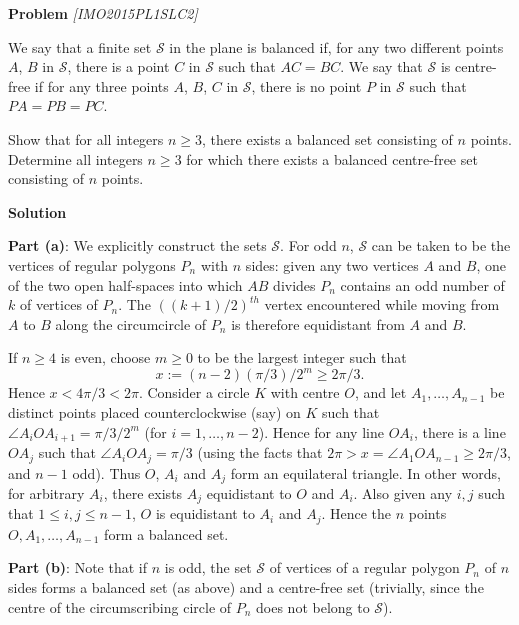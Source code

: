 \begin{problem}



\textbf{Problem}
\textit{[IMO2015PL1SLC2]}


We say that a finite set $\mathcal{S}$ in the plane is balanced if, for any two different points $A$, $B$ in $\mathcal{S}$, there is a point $C$ in $\mathcal{S}$ such that $AC=BC$. We say that $\mathcal{S}$ is centre-free if for any three points $A$, $B$, $C$ in $\mathcal{S}$, there is no point $P$ in $\mathcal{S}$ such that $PA=PB=PC$.

Show that for all integers $n\geq 3$, there exists a balanced set consisting of $n$ points.
Determine all integers $n\geq 3$ for which there exists a balanced centre-free set consisting of $n$ points.

\textbf{Solution}

\textbf{Part (a)}: We explicitly construct the sets $\mathcal{S}$. For odd $n$, $\mathcal{S}$ can be taken to be the vertices of regular polygons $P_n$ with $n$ sides: given any two vertices $A$ and $B$, one of the two open half-spaces into which $AB$ divides $P_n$ contains an odd number of $k$ of vertices of $P_n$. The $((k+1)/2)^{th}$ vertex encountered while moving from $A$ to $B$ along the circumcircle of $P_n$ is therefore equidistant from $A$ and $B$.

If $n \geq 4$ is even, choose $m\geq 0$ to be the largest integer such that\[x:=(n-2)(\pi/3)/2^m \geq 2\pi/3.\]Hence $x < 4\pi/3 < 2\pi$. Consider a circle $K$ with centre $O$, and let $A_1, \ldots, A_{n-1}$ be distinct points placed counterclockwise (say) on $K$ such that $\angle A_iOA_{i+1}=\pi/3/2^m$ (for $i=1,\ldots,n-2$). Hence for any line $OA_i$, there is a line $OA_j$ such that $\angle A_iOA_j=\pi/3$ (using the facts that $2\pi > x=\angle A_1OA_{n-1} \geq 2\pi/3$, and $n-1$ odd). Thus $O$, $A_i$ and $A_j$ form an equilateral triangle. In other words, for arbitrary $A_i$, there exists $A_j$ equidistant to $O$ and $A_i$. Also given any $i,j$ such that $1 \leq i, j \leq n-1$, $O$ is equidistant to $A_i$ and $A_j$. Hence the $n$ points $O, A_1, \ldots, A_{n-1}$ form a balanced set.

\textbf{Part (b)}: Note that if $n$ is odd, the set $\mathcal{S}$ of vertices of a regular polygon $P_n$ of $n$ sides forms a balanced set (as above) and a centre-free set (trivially, since the centre of the circumscribing circle of $P_n$ does not belong to $\mathcal{S}$).


\end{problem}

